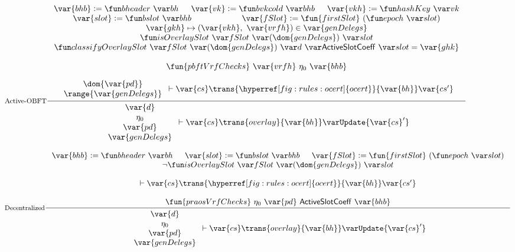 \begin{figure}[ht]
  \begin{equation}\label{eq:active-pbft}
    \inference[Active-OBFT]
    {
      \var{bhb}\leteq\bheader{bh}
      &
      \var{vk}\leteq\bvkcold{bhb}
      &
      \var{vkh}\leteq\hashKey{vk}
      \\
      \var{slot} \leteq \bslot{bhb}
      &
      \var{fSlot} \leteq \fun{firstSlot}~(\epoch{slot})
      \\
      \var{gkh}\mapsto(\var{vkh},~\var{vrfh})\in\var{genDelegs}
      \\
      \isOverlaySlot{fSlot}{(\dom{genDelegs})}{slot}\\
      \classifyOverlaySlot{fSlot}{(\dom{genDelegs})}{d}{\ActiveSlotCoeff}{slot} = \var{ghk}
      \\~\\
      \fun{pbftVrfChecks}~\var{vrfh}~\eta_0~\var{bhb}
      \\~\\
      {
        {\begin{array}{c}
         \dom{\var{pd}} \\
         \range{\var{genDelegs}} \\
         \end{array}
        }
        \vdash\var{cs}\trans{\hyperref[fig:rules:ocert]{ocert}}{\var{bh}}\var{cs'}
      }
    }
    {
      {\begin{array}{c}
         \var{d} \\
         \eta_0 \\
         \var{pd} \\
         \var{genDelegs} \\
       \end{array}}
      \vdash
      \var{cs}
      \trans{overlay}{\var{bh}}
      \varUpdate{\var{cs}'}
    }
  \end{equation}

  \nextdef

  \begin{equation}\label{eq:decentralized}
    \inference[Decentralized]
    {
      \var{bhb}\leteq\bheader{bh}
      &
      \var{slot} \leteq \bslot{bhb}
      &
      \var{fSlot} \leteq \fun{firstSlot}~(\epoch{slot})
      \\
      \neg\isOverlaySlot{fSlot}{(\dom{genDelegs})}{slot}\\
      \\~\\
      {
        \vdash\var{cs}\trans{\hyperref[fig:rules:ocert]{ocert}}{\var{bh}}\var{cs'}
      }
      \\~\\
      \fun{praosVrfChecks}~\eta_0~\var{pd}~\ActiveSlotCoeff~\var{bhb}
    }
    {
      {\begin{array}{c}
         \var{d} \\
         \eta_0 \\
         \var{pd} \\
         \var{genDelegs} \\
       \end{array}}
      \vdash
      \var{cs}
      \trans{overlay}{\var{bh}}
      \varUpdate{\var{cs}'}
    }
  \end{equation}


\end{figure}
